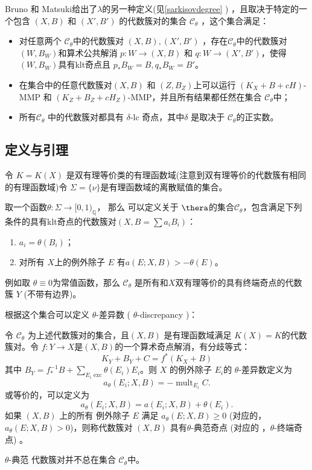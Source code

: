 Bruno 和 Matsuki给出了$\lambda$的另一种定义(见\ref{sarkisovdegree} ) ，且取决于特定的一个包含 $(X,B)$ 和 $(X',B')$ 的代数簇对的集合 $\mathcal{C}_{\theta}$ ，这个集合满足：
\begin{itemize}
  \item
   对任意两个  $\mathcal{C}_{\theta}$中的代数簇对 $(X,B),(X',B')$ ，存在$\mathcal{C}_\theta$中的代数簇对 $(W,B_W)$和算术公共解消 $p:W\to (X,B)$ 和 $q:W\to (X',B')$，使得 $(W,B_W)$具有klt奇点且 $p_*B_W=B,q_*B_W=B'$。
  \item  在集合中的任意代数簇对$(X,B)$ 和 $(Z,B_Z)$上可以运行  $(K_X+B+cH)$-MMP 和 $(K_Z+B_Z+cH_Z)$-MMP，并且所有结果都任然在集合 $\mathcal{C}_{\theta}$中；
  \item 所有$\mathcal{C}_{\theta}$ 中的代数簇对都具有 $\delta$-lc 奇点，其中$\delta$ 是取决于 $\mathcal{C}_{\theta}$的正实数。 
\end{itemize}

\subsection{定义与引理}
令 $ K=K(X) $ 是双有理等价类的有理函数域(注意到双有理等价的代数簇有相同的有理函数域)令 $ \Sigma=\{\nu\} $是有理函数域的离散赋值的集合。
\begin{definition}\label{thetacategory}
  \cite[Definition 3.5]{brunoLogSarkisovProgram1995}
  取一个函数$\theta:\Sigma\to [0,1)_\mathbb{Q}$， 那么 可以定义关于  $\thera$的集合$ \mathcal{C}_\theta $，包含满足下列条件的具有klt奇点的代数簇对$ (X,B=\sum a_{i}B_{i}) $：
  \begin{enumerate}
    \item $ a_i=\theta(B_i) $；
    \item 对所有 $ X $上的例外除子 $E $ 有$ a(E;X,B)>-\theta(E) $。
  \end{enumerate}
\end{definition}
\begin{remark}
例如取 $\theta \equiv 0$为常值函数，那么 $\mathcal{C}_{\theta}$ 是所有和$X$双有理等价的具有终端奇点的代数簇 $Y$ (不带有边界)。
\end{remark}
  根据这个集合可以定义 $\theta$-差异数 ( $\theta$-discrepancy )：
\begin{definition}
  令 $\mathcal{C}_{\theta}$ 为上述代数簇对的集合，且$(X, B)$ 是有理函数域满足 $K(X)=K$的代数簇对。令  $f: Y\to X$是$(X, B)$的一个算术奇点解消，有分歧等式：
  \[
    K_{Y}+B_{Y}+C=f^*(K_{X}+B)
  \]
  其中 $B_{Y}=f^{-1}_*B+ \sum_{E_{i}\text{ exc}} \theta(E_{i})E_{i}$。则 $X$ 的例外除子 $E_{i}$的 $\theta$-差异数定义为
  \[
    a_{\theta}(E_{i};X,B)=-\operatorname{mult}_{E_{i}}C.
  \]
  或等价的，可以定义为
  \[
    a_{\theta}(E_{i};X,B)=a(E_{i};X,B)+\theta(E_{i}).
  \]
  如果 $(X,B)$ 上的所有 例外除子 $E$ 满足   $a_{\theta}(E;X,B)\geqslant 0$ (对应的， $a_{\theta}(E;X,B)> 0$)，则称代数簇对 $(X,B)$ 具有$\theta$-典范奇点 (对应的 ，$\theta$-终端奇点)  。
\end{definition}
\begin{remark}
 $\theta$-典范 代数簇对并不总在集合 $\mathcal{C}_{\theta}$中。
\end{remark}

